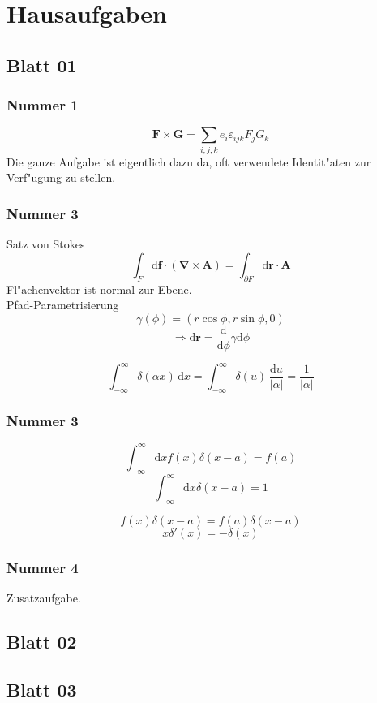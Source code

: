 \documentclass[titlepage,11pt,a4paper,ngerman]{report}
\newcommand{\dd}{\mathrm{d}}
\renewcommand{\vec}[1]{\bm{#1}}
\renewcommand{\epsilon}{\varepsilon}
\newcommand{\vabla}{\vec{\nabla}}
\begin{document}
\chapter{Hausaufgaben}

\section{Blatt 01}

\subsection{Nummer 1}

\[\vec{F}\times\vec{G}=\sum_{i,j,k}e_i\epsilon_{ijk}F_jG_k\]
Die ganze Aufgabe ist eigentlich dazu da, oft verwendete Identit"aten zur Verf"ugung zu stellen.

\subsection{Nummer 3}

Satz von Stokes
\[\int_F\dd\vec{f}\cdot(\vabla\times\vec{A})=\int_{\partial F}\dd\vec{r}\cdot\vec{A}\]
Fl"achenvektor ist normal zur Ebene.\\
Pfad-Parametrisierung
\[\gamma(\phi)=(r\cos\phi,r\sin\phi,0)\]
\[\Rightarrow\dd\vec{r}=\frac{\dd}{\dd\phi}\gamma\dd\phi\]

\[\int _{-\infty }^{\infty }\delta (\alpha x)\,\dd x=\int _{-\infty }^{\infty }\delta (u)\,{\frac {\dd u}{|\alpha |}}={\frac {1}{|\alpha |}}\]

\subsection{Nummer 3}

\[\int_{-\infty}^\infty\dd xf(x)\delta(x-a)=f(a)\]
\[\int_{-\infty}^\infty\dd x\delta(x-a)=1\]

\[f(x)\delta(x-a)=f(a)\delta(x-a)\]
\[x\delta'(x)=-\delta(x)\]

\subsection{Nummer 4}

Zusatzaufgabe.

\section{Blatt 02}

\section{Blatt 03}
\end{document}

